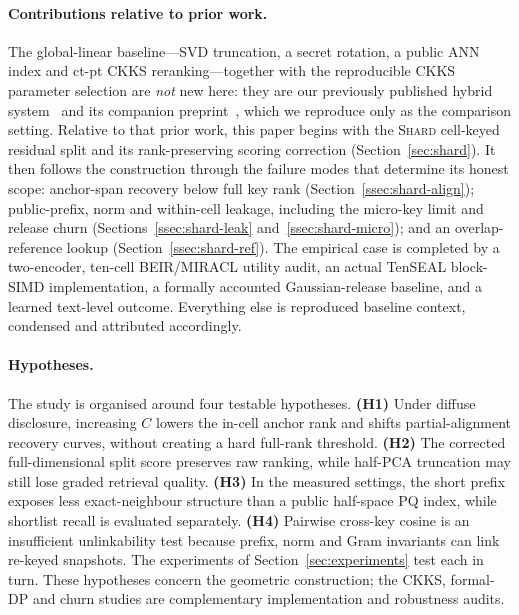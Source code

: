 \documentclass[11pt,a4paper]{article}
\begin{document}
\paragraph{Contributions relative to prior work.} The global-linear
baseline---SVD truncation, a secret rotation, a public ANN index and ct-pt
CKKS reranking---together with the reproducible CKKS parameter selection are
\emph{not} new here: they are our previously published hybrid
system~\cite{ref_vkit} and its companion preprint~\cite{ref_alpha}, which we
reproduce only as the comparison setting. Relative to that prior work, this
paper begins with the \textsc{Shard} cell-keyed residual split and its
rank-preserving scoring correction (Section~\ref{sec:shard}). It then follows
the construction through the failure modes that determine its honest scope:
anchor-span recovery below full key rank (Section~\ref{ssec:shard-align});
public-prefix, norm and within-cell leakage, including the micro-key limit and
release churn (Sections~\ref{ssec:shard-leak} and~\ref{ssec:shard-micro}); and
an overlap-reference lookup (Section~\ref{ssec:shard-ref}). The empirical case
is completed by a two-encoder, ten-cell BEIR/MIRACL utility audit, an actual
TenSEAL block-SIMD implementation, a formally accounted Gaussian-release
baseline, and a learned text-level outcome. Everything else is reproduced
baseline context, condensed and attributed accordingly.

\paragraph{Hypotheses.} The study is organised around four testable
hypotheses. \textbf{(H1)} Under diffuse disclosure, increasing $C$ lowers
the in-cell anchor rank and shifts partial-alignment recovery curves, without
creating a hard full-rank threshold. \textbf{(H2)} The corrected
full-dimensional split score preserves raw ranking, while half-PCA truncation
may still lose graded retrieval quality. \textbf{(H3)} In the measured
settings, the short prefix exposes less exact-neighbour structure than a
public half-space PQ index, while shortlist recall is evaluated separately.
\textbf{(H4)} Pairwise cross-key cosine is an
insufficient unlinkability test because prefix, norm and Gram invariants can
link re-keyed snapshots. The experiments of
Section~\ref{sec:experiments} test each in turn. These hypotheses concern the
geometric construction; the CKKS, formal-DP and churn studies are
complementary implementation and robustness audits.
\end{document}
